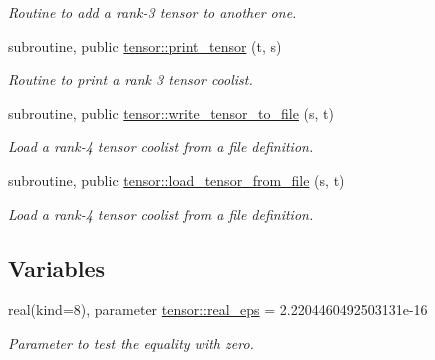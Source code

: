 \begin{DoxyCompactItemize}
\begin{DoxyCompactList}\small\item\em Routine to add a rank-\/3 tensor to another one. \end{DoxyCompactList}\item 
subroutine, public \hyperlink{namespacetensor_a1fbaf180beb7fe8ab83ade2f576db80f}{tensor\+::print\+\_\+tensor} (t, s)
\begin{DoxyCompactList}\small\item\em Routine to print a rank 3 tensor coolist. \end{DoxyCompactList}\item 
subroutine, public \hyperlink{namespacetensor_ab9cef88cb38333ed2c063cdf08f28060}{tensor\+::write\+\_\+tensor\+\_\+to\+\_\+file} (s, t)
\begin{DoxyCompactList}\small\item\em Load a rank-\/4 tensor coolist from a file definition. \end{DoxyCompactList}\item 
subroutine, public \hyperlink{namespacetensor_ac4c6ebce7aee73aebac2514e45f7cc78}{tensor\+::load\+\_\+tensor\+\_\+from\+\_\+file} (s, t)
\begin{DoxyCompactList}\small\item\em Load a rank-\/4 tensor coolist from a file definition. \end{DoxyCompactList}\end{DoxyCompactItemize}
\subsection*{Variables}
\begin{DoxyCompactItemize}
\item 
real(kind=8), parameter \hyperlink{namespacetensor_a2a2ab182d86107e62533c3f0043652cc}{tensor\+::real\+\_\+eps} = 2.\+2204460492503131e-\/16
\begin{DoxyCompactList}\small\item\em Parameter to test the equality with zero. \end{DoxyCompactList}\end{DoxyCompactItemize}
